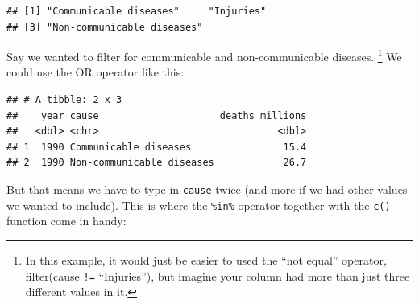 \documentclass[
  12pt,
  krantz2]{krantz}
\makeatletter
\newenvironment{Shaded}{\begin{snugshade}}{\end{snugshade}}
\newcommand{\CommentTok}[1]{\textcolor[rgb]{0.56,0.35,0.01}{\textit{#1}}}
\newcommand{\DecValTok}[1]{\textcolor[rgb]{0.00,0.00,0.81}{#1}}
\newcommand{\KeywordTok}[1]{\textcolor[rgb]{0.13,0.29,0.53}{\textbf{#1}}}
\newcommand{\NormalTok}[1]{#1}
\newcommand{\OperatorTok}[1]{\textcolor[rgb]{0.81,0.36,0.00}{\textbf{#1}}}
\newcommand{\StringTok}[1]{\textcolor[rgb]{0.31,0.60,0.02}{#1}}
\newenvironment{kframe}{%
\medskip{}
\setlength{\fboxsep}{.8em}
 \def\at@end@of@kframe{}%
 \ifinner\ifhmode%
  \def\at@end@of@kframe{\end{minipage}}%
  \begin{minipage}{\columnwidth}%
 \fi\fi%
 \def\FrameCommand##1{\hskip\@totalleftmargin \hskip-\fboxsep
 \colorbox{shadecolor}{##1}\hskip-\fboxsep
     \hskip-\linewidth \hskip-\@totalleftmargin \hskip\columnwidth}%
 \MakeFramed {\advance\hsize-\width
   \@totalleftmargin\z@ \linewidth\hsize
   \@setminipage}}%
 {\par\unskip\endMakeFramed%
 \at@end@of@kframe}
\renewenvironment{Shaded}{\begin{kframe}}{\end{kframe}}
\makeatother
\begin{document}
\begin{Shaded}
\end{Shaded}

\begin{verbatim}
## [1] "Communicable diseases"     "Injuries"                 
## [3] "Non-communicable diseases"
\end{verbatim}

Say we wanted to filter for communicable and non-communicable diseases.
\footnote{In this example, it would just be easier to used the ``not equal'' operator, filter(cause \texttt{!=} ``Injuries''), but imagine your column had more than just three different values in it.} We could use the OR operator \texttt{\textbar{}} like this:

\begin{Shaded}
\end{Shaded}

\begin{verbatim}
## # A tibble: 2 x 3
##    year cause                     deaths_millions
##   <dbl> <chr>                               <dbl>
## 1  1990 Communicable diseases                15.4
## 2  1990 Non-communicable diseases            26.7
\end{verbatim}

But that means we have to type in \texttt{cause} twice (and more if we had other values we wanted to include).
This is where the \texttt{\%in\%} operator together with the \texttt{c()} function come in handy:

\begin{Shaded}
\end{Shaded}
\end{document}

